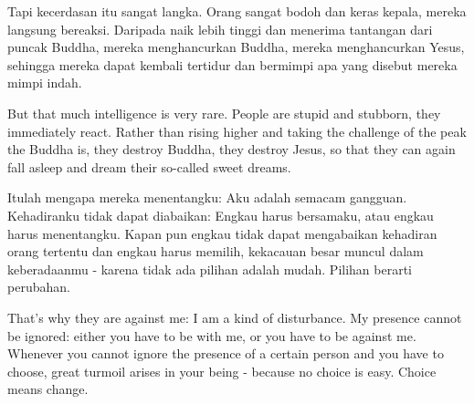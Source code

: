 \bahasa
Tapi kecerdasan itu sangat langka. Orang sangat bodoh dan keras kepala, mereka langsung bereaksi. Daripada naik lebih tinggi dan menerima tantangan dari puncak Buddha, mereka menghancurkan Buddha, mereka menghancurkan Yesus, sehingga mereka dapat kembali tertidur dan bermimpi apa yang disebut mereka mimpi indah.

\english
But that much intelligence is very rare. People are stupid and stubborn, they immediately react. Rather than rising higher and taking the challenge of the peak the Buddha is, they destroy Buddha, they destroy Jesus, so that they can again fall asleep and dream their so-called sweet dreams.

\bahasa
Itulah mengapa mereka menentangku: Aku adalah semacam gangguan. Kehadiranku tidak dapat diabaikan: Engkau harus bersamaku, atau engkau harus menentangku. Kapan pun engkau tidak dapat mengabaikan kehadiran orang tertentu dan engkau harus memilih, kekacauan besar muncul dalam keberadaanmu - karena tidak ada pilihan adalah mudah. Pilihan berarti perubahan.

\english
That's why they are against me: I am a kind of disturbance. My presence cannot be ignored: either you have to be with me, or you have to be against me. Whenever you cannot ignore the presence of a certain person and you have to choose, great turmoil arises in your being - because no choice is easy. Choice means change.
